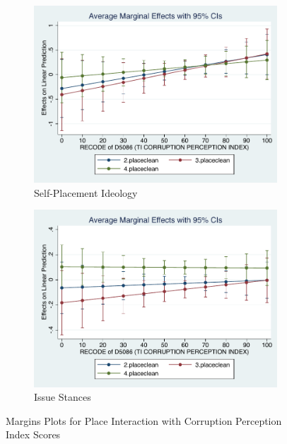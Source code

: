 \documentclass[12pt, titlepage]{article}
\begin{document}
\begin{figure}[H]
	\centering
	\begin{subfigure}[b]{0.475\textwidth}   
		\centering 
		\includegraphics[width=\textwidth]{Margins/IdeoPlaceCorrupt}
		\caption{Self-Placement Ideology}
	\end{subfigure}
	\hfill
	\begin{subfigure}[b]{0.475\textwidth}
		\centering 
		\includegraphics[width=\textwidth]{Margins/LibPlaceCorrupt}
		\caption{Issue Stances}
	\end{subfigure}
	\caption{Margins Plots for Place Interaction with Corruption Perception Index Scores}
	\label{Corruption}
\end{figure}
\end{document}
